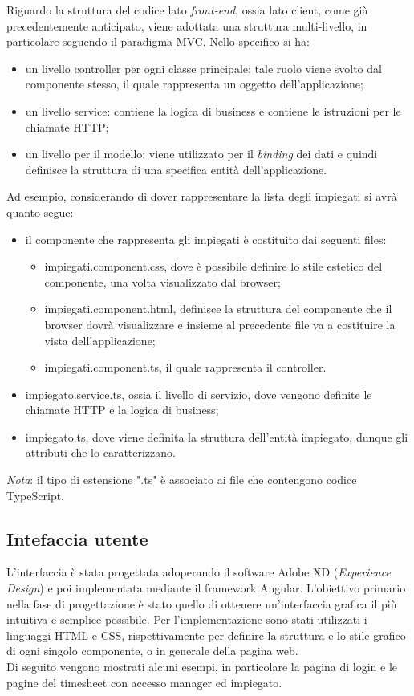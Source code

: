 \noindent 
Riguardo la struttura del codice lato \textit{front-end}, ossia lato client, come già precedentemente anticipato, viene adottata una struttura multi-livello, in particolare seguendo il paradigma MVC. Nello specifico si ha:
\begin{itemize}
    \item un livello controller per ogni classe principale: tale ruolo viene svolto dal componente stesso, il quale rappresenta un oggetto dell'applicazione;
    \item un livello service: contiene la logica di business e contiene le istruzioni per le chiamate HTTP;
    \item un livello per il modello: viene utilizzato per il \textit{binding} dei dati e quindi definisce la struttura di una specifica entità dell'applicazione.
\end{itemize}
\noindent
Ad esempio, considerando di dover rappresentare la lista degli impiegati si avrà quanto segue:
\begin{itemize}
    \item il componente che rappresenta gli impiegati è costituito dai seguenti files:
    \begin{itemize}
        \item impiegati.component.css, dove è possibile definire lo stile estetico del componente, una volta visualizzato dal browser;
        \item impiegati.component.html, definisce la struttura del componente che il browser dovrà visualizzare e insieme al precedente file va a costituire la vista dell'applicazione;
        \item impiegati.component.ts, il quale rappresenta il controller.
    \end{itemize}
    \item impiegato.service.ts, ossia il livello di servizio, dove vengono definite le chiamate HTTP e la logica di business;
    \item impiegato.ts, dove viene definita la struttura dell'entità impiegato, dunque gli attributi che lo caratterizzano.
\end{itemize}

\noindent
\textit{Nota}: il tipo di estensione ".ts" è associato ai file che contengono codice TypeScript.


\subsection{Intefaccia utente}
L'interfaccia è stata progettata adoperando il software Adobe XD (\textit{Experience Design}) e poi implementata mediante il framework Angular. L'obiettivo primario nella fase di progettazione è stato quello di ottenere un'interfaccia grafica il più intuitiva e semplice possibile. Per l'implementazione sono stati utilizzati i linguaggi HTML e CSS, rispettivamente per definire la struttura e lo stile grafico di ogni singolo componente, o in generale della pagina web. \\
Di seguito vengono mostrati alcuni esempi, in particolare la pagina di login e le pagine del timesheet con accesso manager ed impiegato.

